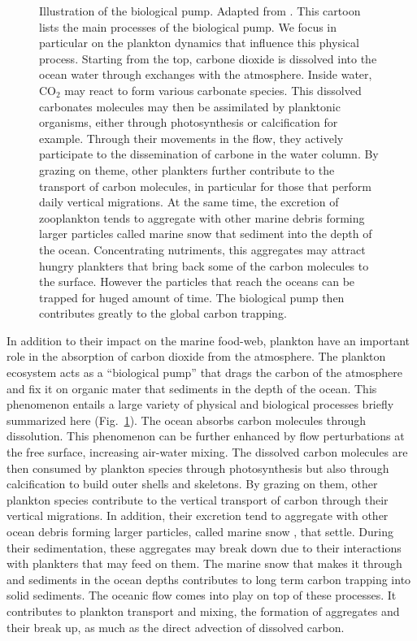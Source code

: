\begin{figure}
	\centering
	\def\svgwidth{0.9\textwidth}
	
  	\caption[Illustration of the biological pump.]{
  		Illustration of the biological pump.
  		Adapted from \citet{ducklow2001upper}.
  		This cartoon lists the main processes of the biological pump. 
  		We focus in particular on the plankton dynamics that influence this physical process.
  		Starting from the top, carbone dioxide is dissolved into the ocean water through exchanges with the atmosphere. Inside water, CO$_2$ may react to form various carbonate species. This dissolved carbonates molecules may then be assimilated by planktonic organisms, either through photosynthesis or calcification for example. 
  		Through their movements in the flow, they actively participate to the dissemination of carbone in the water column.
  		By grazing on theme, other plankters further contribute to the transport of carbon molecules, in particular for those that perform daily vertical migrations.
  		At the same time, the excretion of zooplankton tends to aggregate with other marine debris forming larger particles called marine snow that sediment into the depth of the ocean.
  		Concentrating nutriments, this aggregates may attract hungry plankters that bring back some of the carbon molecules to the surface.
  		However the particles that reach the oceans can be trapped for huged amount of time.
  		The biological pump then contributes greatly to the global carbon trapping.
  	}
  	\label{fig:biological_pump}
\end{figure}
In addition to their impact on the marine food-web, plankton have an important role in the absorption of carbon dioxide from the atmosphere.
The plankton ecosystem acts as a ``biological pump'' that drags the carbon of the atmosphere and fix it on organic mater that sediments in the depth of the ocean.
This phenomenon entails a large variety of physical and biological processes briefly summarized here (Fig.~\ref{fig:biological_pump}).
The ocean absorbs carbon molecules through dissolution.
This phenomenon can be further enhanced by flow perturbations at the free surface, increasing air-water mixing.
The dissolved carbon molecules are then consumed by plankton species through photosynthesis but also through calcification to build outer shells and skeletons.
By grazing on them, other plankton species contribute to the vertical transport of carbon through their vertical migrations.
In addition, their excretion tend to aggregate with other ocean debris forming larger particles, called marine snow \citep{alldredge1988characteristics, turner2015zooplankton}, that settle.
During their sedimentation, these aggregates may break down due to their interactions with plankters that may feed on them.
The marine snow that makes it through and sediments in the ocean depths contributes to long term carbon trapping into solid sediments.
The oceanic flow comes into play on top of these processes.
It contributes to plankton transport and mixing, the formation of aggregates and their break up, as much as the direct advection of dissolved carbon.

